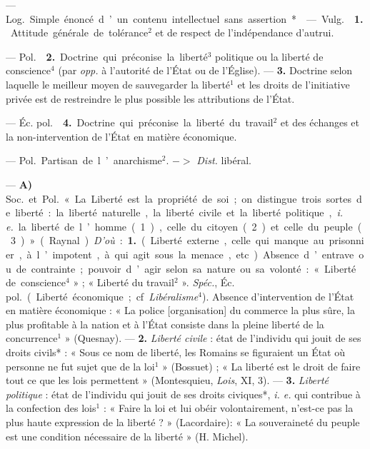 \begin{itemize}[leftmargin=1cm, label=, itemsep=1pt]
 — \si{Log.} Simple énoncé d’un contenu intellectuel sans
assertion*.

 — \si{Vulg.}  {\bf 1.} Attitude générale de
tolérance$^2$ et de respect de l'indépendance d’autrui.

— \si{Pol.}  {\bf 2.} Doctrine qui préconise la liberté$^3$
politique ou la liberté de conscience$^4$ (par {\it opp.} à l'autorité de
l'État ou de l'Église). — {\bf 3.} Doctrine selon laquelle le meilleur moyen
de sauvegarder la liberté$^1$ et les droits de l'initiative privée est de
restreindre le plus possible les attributions de l’État.

— \si{Éc. pol.}  {\bf 4.} Doctrine qui préconise la liberté du
travail$^2$ et des échanges et la non-intervention de l'État en matière
économique.

 — \si{Pol.} Partisan de l’anarchisme$^2$. $->$ {\it  Dist.}
libéral.

 — {\bf A)} \si{Soc.} et \si{Pol.} « La Liberté
est la propriété de soi ; on distingue
trois sortes de liberté : la liberté naturelle, la liberté civile et la
liberté politique, {\it i. e.} la liberté de l’homme (1), celle du citoyen
(2) et celle du peuple (3) » (Raynal). {\it D'où} : {\bf 1.} (Liberté
externe, celle qui manque au prisonnier, à l’impotent, à qui agit sous la
menace, etc.). Absence d’entrave ou de contrainte; pouvoir d’agir selon sa
nature ou sa volonté : « Liberté de conscience$^4$ » ; « Liberté du
travail$^2$ ». {\it Spéc.}, \si{Éc. pol.} (Liberté économique; cf.
{\it Libéralisme}$^4$). Absence d'intervention de l'État en matière
économique : « La police [organisation] du commerce la plus sûre, la plus
profitable à la nation et à l'État consiste dans la pleine liberté de la
concurrence$^1$ » (Quesnay). — {\bf 2.} {\it Liberté civile} : état de
l'individu qui jouit de ses droits civils* : « Sous ce nom de liberté, les
Romains se figuraient un État où personne ne fut sujet que de la
loi$^1$ » (Bossuet) ; « La liberté est le droit de faire tout ce que les
lois permettent » (Montesquieu, {\it Lois}, XI, 3). — {\bf 3.} {\it Liberté
politique} : état de l'individu qui jouit de ses droits civiques*, {\it i.
e.} qui contribue à la confection des lois$^1$ : « Faire la loi et lui obéir
volontairement, n'est-ce pas la plus haute expression de la
liberté ? » (Lacordaire): « La souveraineté du peuple est une condition
nécessaire de la liberté » (H. Michel).


\end{itemize}
